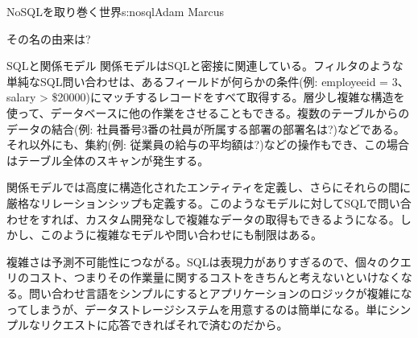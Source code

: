 \begin{aosachapter}{NoSQLを取り巻く世界}{s:nosql}{Adam Marcus}
\begin{aosasect1}{その名の由来は?}
\begin{aosasect2}{SQLと関係モデル}
関係モデルはSQLと密接に関連している。フィルタのような単純なSQL問い合わせは、あるフィールドが何らかの条件(例: employeeid = 3、salary > \$20000)にマッチするレコードをすべて取得する。層少し複雑な構造を使って、データベースに他の作業をさせることもできる。複数のテーブルからのデータの結合(例: 社員番号3番の社員が所属する部署の部署名は?)などである。それ以外にも、集約(例: 従業員の給与の平均額は?)などの操作もでき、この場合はテーブル全体のスキャンが発生する。

関係モデルでは高度に構造化されたエンティティを定義し、さらにそれらの間に厳格なリレーションシップも定義する。このようなモデルに対してSQLで問い合わせをすれば、カスタム開発なしで複雑なデータの取得もできるようになる。しかし、このように複雑なモデルや問い合わせにも制限はある。

\begin{aosaitemize}

  \item 複雑さは予測不可能性につながる。SQLは表現力がありすぎるので、個々のクエリのコスト、つまりその作業量に関するコストをきちんと考えないといけなくなる。問い合わせ言語をシンプルにするとアプリケーションのロジックが複雑になってしまうが、データストレージシステムを用意するのは簡単になる。単にシンプルなリクエストに応答できればそれで済むのだから。


\end{aosaitemize}
\end{aosasect2}
\end{aosasect1}
\end{aosachapter}
